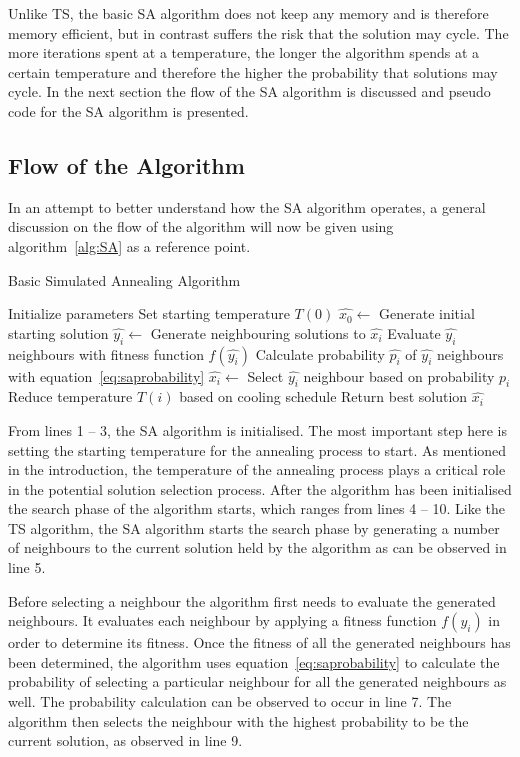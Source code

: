 Unlike \gls{TS}, the basic \gls{SA} algorithm does not keep any memory and is therefore memory efficient, but in contrast suffers the risk that the solution may cycle. The more iterations spent at a temperature, the longer the algorithm spends at a certain temperature and therefore the higher the probability that solutions may cycle. In the next section the flow of the \gls{SA} algorithm is discussed and pseudo code for the \gls{SA} algorithm is presented.

\subsection{Flow of the Algorithm}
In an attempt to better understand how the \gls{SA} algorithm operates, a general discussion on the flow of the algorithm will now be given using algorithm~\ref{alg:SA} as a reference point.
\begin{algorithm}[H]
\caption{Basic Simulated Annealing Algorithm\cite{VeryFastSAImageEnchancement,ChaosSA}}
\label{alg:SA}
	\begin{algorithmic}[1]
		\State Initialize parameters
		\State Set starting temperature $T(0)$
    \State $\hat{x_0} \leftarrow$ Generate initial starting solution
    \State $\hat{y_i} \leftarrow$ Generate neighbouring solutions to $\hat{x_i}$
    \State Evaluate $\hat{y_i}$ neighbours with fitness function $f(\hat{y_i})$
    \State Calculate probability $\hat{p_i}$ of $\hat{y_i}$ neighbours with equation~\ref{eq:saprobability}
    \State $\hat{x_i} \leftarrow$ Select $\hat{y_i}$ neighbour based on probability $p_i$
			\State Reduce temperature $T(i)$ based on cooling schedule
		\EndWhile
    \State Return best solution $\hat{x_i}$
	\end{algorithmic}
\end{algorithm}

From lines 1 -- 3, the \gls{SA} algorithm is initialised. The most important step here is setting the starting temperature for the annealing process to start. As mentioned in the introduction, the temperature of the annealing process plays a critical role in the potential solution selection process. After the algorithm has been initialised the search phase of the algorithm starts, which ranges from lines 4 -- 10. Like the \gls{TS} algorithm, the \gls{SA} algorithm starts the search phase by generating a number of neighbours to the current solution held by the algorithm as can be observed in line 5.

Before selecting a neighbour the algorithm first needs to evaluate the generated neighbours. It evaluates each neighbour by applying a fitness function $f(y_i)$ in order to determine its fitness.
Once the fitness of all the generated neighbours has been determined, the algorithm uses equation~\ref{eq:saprobability} to calculate the probability of selecting a particular neighbour for all the generated neighbours as well. The probability calculation can be observed to occur in line 7. The algorithm then selects the neighbour with the highest probability to be the current solution, as observed in line 9. 

